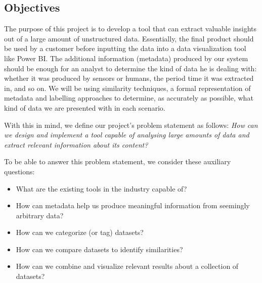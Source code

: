 \subsection{Objectives}
The purpose of this project is to develop a tool that can extract valuable insights out of a large amount of unstructured data.
Essentially, the final product should be used by a customer before inputting the data into a data visualization tool like Power BI.
The additional information (metadata) produced by our system should be enough for an analyst to determine the kind of data
he is dealing with: whether it was produced by sensors or humans, the period time it was extracted in, and so on.
We will be using similarity techniques, a formal representation of metadata and labelling approaches to determine, as
accurately as possible, what kind of data we are presented with in each scenario.

\bigbreak

With this in mind, we define our project's problem statement as follows:
\textit{How can we design and implement a tool capable of analysing large amounts of data and extract relevant
information about its content?}

To be able to answer this problem statement, we consider these auxiliary questions:
\begin{itemize}
    \item What are the existing tools in the industry capable of?
    \item How can metadata help us produce meaningful information from seemingly arbitrary data?
    \item How can we categorize (or tag) datasets?
    \item How can we compare datasets to identify similarities?
    \item How can we combine and visualize relevant results about a collection of datasets?
\end{itemize}